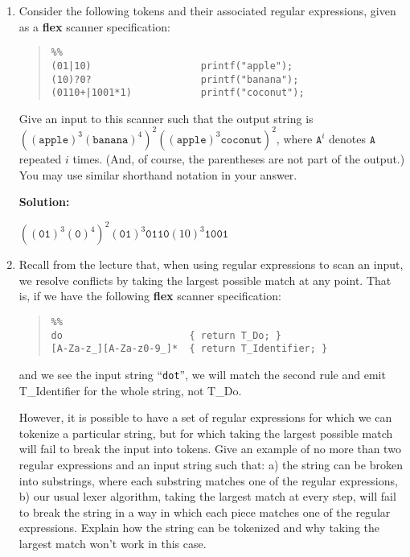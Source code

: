 \documentclass[11pt]{article}
\begin{document}
\begin{enumerate}
\newpage

\item Consider the following tokens and their associated regular expressions, given as a \textbf{flex} scanner specification:
\begin{quote}
\begin{lstlisting}
%%
(01|10)                   printf("apple");
(10)?0?                   printf("banana");
(0110+|1001*1)            printf("coconut");
\end{lstlisting}
\end{quote}
Give an input to this scanner such that the output string is $((\mathtt{apple})^3 (\mathtt{banana})^4)^2 ((\mathtt{apple})^3\mathtt{coconut})^2$, where $\mathtt{A}^i$ denotes $\mathtt{A}$ repeated $i$ times.   (And, of course, the parentheses are not part of the output.)  You may use similar shorthand notation in your answer.

\textbf{Solution:}

    \begin{center}
        $((\mathtt{01})^3 (\mathtt{0})^4)^2(\mathtt{01})^3\mathtt{0110}(10)^3\mathtt{1001}$    
    \end{center}
    
\newpage

\item Recall from the lecture that, when using regular expressions to scan an input, we resolve conflicts by taking the largest possible match at any point. That is, if we have the following \textbf{flex} scanner specification:
\begin{quote}
\begin{lstlisting}
%%
do                      { return T_Do; }
[A-Za-z_][A-Za-z0-9_]*  { return T_Identifier; }
\end{lstlisting}
\end{quote}
and we see the input string ``\texttt{dot}'', we will match the second rule and emit T\_Identifier for the whole string, not T\_Do.

However, it is possible to have a set of regular expressions for which we can tokenize a particular string, but for which taking the largest possible match will fail to break the input into tokens. Give an example of no more than two regular expressions and an input string such that: a) the string can be broken into substrings, where each substring matches one of the regular expressions, b) our usual lexer algorithm, taking the largest match at every step, will fail to break the string in a way in which each piece matches one of the regular expressions. Explain how the string can be tokenized and why taking the largest match won't work in this case.


\end{enumerate}
\end{document}
